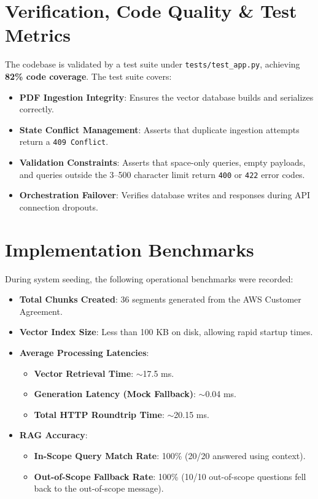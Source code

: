 \documentclass[11pt,a4paper]{article}
\begin{document}
\section{Verification, Code Quality \& Test Metrics}
The codebase is validated by a test suite under \texttt{tests/test\_app.py}, achieving \textbf{82\% code coverage}. The test suite covers:
\begin{itemize}
    \item \textbf{PDF Ingestion Integrity}: Ensures the vector database builds and serializes correctly.
    \item \textbf{State Conflict Management}: Asserts that duplicate ingestion attempts return a \texttt{409 Conflict}.
    \item \textbf{Validation Constraints}: Asserts that space-only queries, empty payloads, and queries outside the 3--500 character limit return \texttt{400} or \texttt{422} error codes.
    \item \textbf{Orchestration Failover}: Verifies database writes and responses during API connection dropouts.
\end{itemize}

\section{Implementation Benchmarks}
During system seeding, the following operational benchmarks were recorded:
\begin{itemize}
    \item \textbf{Total Chunks Created}: 36 segments generated from the AWS Customer Agreement.
    \item \textbf{Vector Index Size}: Less than 100 KB on disk, allowing rapid startup times.
    \item \textbf{Average Processing Latencies}:
    \begin{itemize}
        \item \textbf{Vector Retrieval Time}: $\sim$17.5 ms.
        \item \textbf{Generation Latency (Mock Fallback)}: $\sim$0.04 ms.
        \item \textbf{Total HTTP Roundtrip Time}: $\sim$20.15 ms.
    \end{itemize}
    \item \textbf{RAG Accuracy}:
    \begin{itemize}
        \item \textbf{In-Scope Query Match Rate}: 100\% (20/20 answered using context).
        \item \textbf{Out-of-Scope Fallback Rate}: 100\% (10/10 out-of-scope questions fell back to the out-of-scope message).
    \end{itemize}
\end{itemize}
\end{document}
